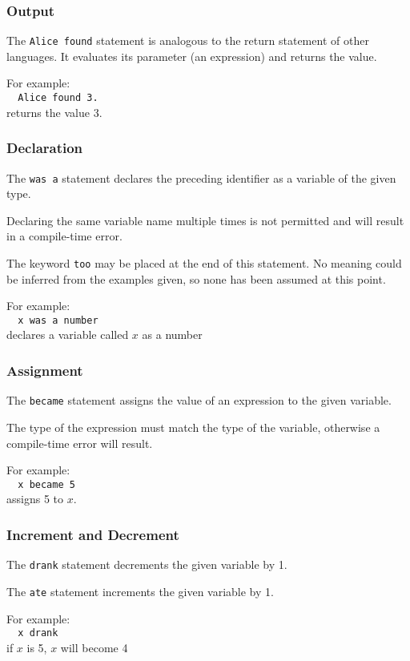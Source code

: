 \documentclass[a4wide, 11pt]{article}
\begin{document}
\subsubsection{Output}
The \verb:Alice found: statement is analogous to the return statement of
other languages. It evaluates its parameter (an expression) and returns the
value.

For example:\\
\verb:  Alice found 3.:\\
returns the value 3.

\subsubsection{Declaration}
The \verb:was a: statement declares the preceding identifier as a variable of
the given type.

Declaring the same variable name multiple times is not permitted and will
result in a compile-time error.

The keyword \verb:too: may be placed at the end of this statement. No meaning
could be inferred from the examples given, so none has been assumed at this point.

For example:\\
\verb:  x was a number:\\
declares a variable called $x$ as a number

\subsubsection{Assignment}
The \verb:became: statement assigns the value of an expression to the given
variable.

The type of the expression must match the type of the variable, otherwise a
compile-time error will result.

For example:\\
\verb:  x became 5:\\
assigns 5 to $x$.

\subsubsection{Increment and Decrement}
The \verb:drank: statement decrements the given variable by 1.

The \verb:ate: statement increments the given variable by 1.

For example:\\
\verb:  x drank:\\
if $x$ is 5, $x$ will become 4
\end{document}

